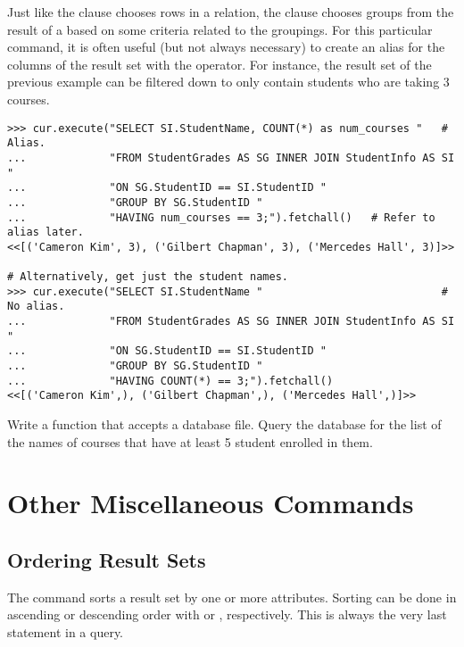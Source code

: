 Just like the  clause chooses rows in a relation, the  clause chooses groups from the result of a  based on some criteria related to the groupings.
For this particular command, it is often useful (but not always necessary) to create an alias for the columns of the result set with the  operator.
For instance, the result set of the previous example can be filtered down to only contain students who are taking 3 courses.

\begin{lstlisting}
>>> cur.execute("SELECT SI.StudentName, COUNT(*) as num_courses "   # Alias.
...             "FROM StudentGrades AS SG INNER JOIN StudentInfo AS SI "
...             "ON SG.StudentID == SI.StudentID "
...             "GROUP BY SG.StudentID "
...             "HAVING num_courses == 3;").fetchall()   # Refer to alias later.
<<[('Cameron Kim', 3), ('Gilbert Chapman', 3), ('Mercedes Hall', 3)]>>

# Alternatively, get just the student names.
>>> cur.execute("SELECT SI.StudentName "                            # No alias.
...             "FROM StudentGrades AS SG INNER JOIN StudentInfo AS SI "
...             "ON SG.StudentID == SI.StudentID "
...             "GROUP BY SG.StudentID "
...             "HAVING COUNT(*) == 3;").fetchall()
<<[('Cameron Kim',), ('Gilbert Chapman',), ('Mercedes Hall',)]>>
\end{lstlisting}

\begin{problem} %
Write a function that accepts a database file.
Query the database for the list of the names of courses that have at least 5 student enrolled in them.
\end{problem}

\section*{Other Miscellaneous Commands} %

\subsection*{Ordering Result Sets} %

The  command sorts a result set by one or more attributes.
Sorting can be done in ascending or descending order with  or , respectively.
This is always the very last statement in a query.

